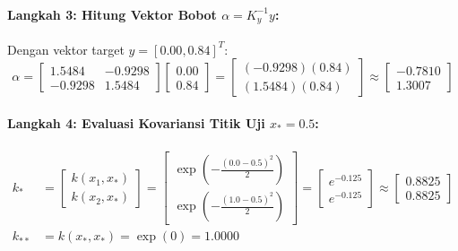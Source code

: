 \documentclass[11pt,a4paper]{article}
\def\boldsymbol#1{#1}%
\def\mathbf#1{#1}%
\begin{document}
\paragraph{Langkah 3: Hitung Vektor Bobot $\boldsymbol{\alpha} = K_y^{-1} \mathbf{y}$:}
Dengan vektor target $\mathbf{y} = [0.00, 0.84]^T$:
\begin{equation}
\boldsymbol{\alpha} = \begin{bmatrix} 1.5484 & -0.9298 \\ -0.9298 & 1.5484 \end{bmatrix} \begin{bmatrix} 0.00 \\ 0.84 \end{bmatrix} = \begin{bmatrix} (-0.9298)(0.84) \\ (1.5484)(0.84) \end{bmatrix} \approx \begin{bmatrix} -0.7810 \\ 1.3007 \end{bmatrix}
\end{equation}

\paragraph{Langkah 4: Evaluasi Kovariansi Titik Uji $x_* = 0.5$:}
\begin{align*}
\mathbf{k}_* &= \begin{bmatrix} k(x_1, x_*) \\ k(x_2, x_*) \end{bmatrix} = \begin{bmatrix} \exp\left(-\frac{(0.0 - 0.5)^2}{2}\right) \\ \exp\left(-\frac{(1.0 - 0.5)^2}{2}\right) \end{bmatrix} = \begin{bmatrix} e^{-0.125} \\ e^{-0.125} \end{bmatrix} \approx \begin{bmatrix} 0.8825 \\ 0.8825 \end{bmatrix} \\
k_{**} &= k(x_*, x_*) = \exp(0) = 1.0000
\end{align*}
\end{document}
